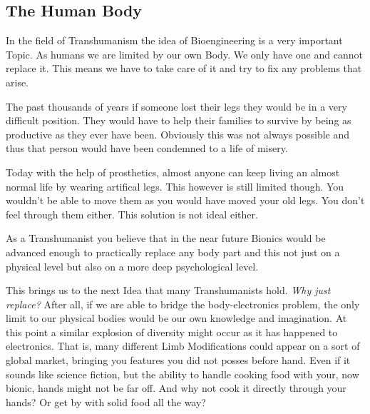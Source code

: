 \documentclass[
			12pt,
			a4paper,
			cleardoublepage=empty,
			final,
			twoside
				]{scrbook}
\begin{document}
    \subsection{The Human Body}
      \begin{par}
	      In the field of Transhumanism the idea of Bioengineering is a very important Topic. 
        As humans we are limited by our own Body. 
        We only have one and cannot replace it. 
        This means we have to take care of it and try to fix any problems that arise. 
      \end{par}
      \begin{par}
        The past thousands of years if someone lost their legs they would be in a very difficult position. 
        They would have to help their families to survive by being as productive as they ever have been. 
        Obviously this was not always possible and thus that person would have been condemned to a life of misery.
      \end{par}
      \begin{par}
        Today with the help of prosthetics, almost anyone can keep living an almost normal life by wearing artifical legs. 
        This however is still limited though. 
        You wouldn't be able to move them as you would have moved your old legs. 
        You don't feel through them either. 
        This solution is not ideal either.
      \end{par}
      \begin{par}
        As a Transhumanist you believe that in the near future Bionics would be advanced enough to practically replace any body part and this not just on a physical level but also on a more deep psychological level.
      \end{par}
      \begin{par}
        This brings us to the next Idea that many Transhumanists hold. \emph{Why just replace?} 
        After all, if we are able to bridge the body-electronics problem, the only limit to our physical bodies would be our own knowledge and imagination. 
        At this point a similar explosion of diversity might occur as it has happened to electronics. 
        That is, many different Limb Modifications could appear on a sort of global market, bringing you features you did not posses before hand. 
        Even if it sounds like science fiction, but the ability to handle cooking food with your, now bionic, hands might not be far off. 
        And why not cook it directly through your hands? Or get by with solid food all the way?
      \end{par}
\end{document}
